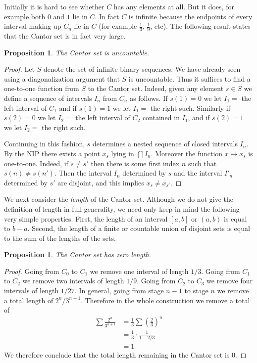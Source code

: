 \documentclass[11pt,oneside]{amsbook}
\theoremstyle{definition}
\theoremstyle{plain}
\newtheorem{proposition}[theorem]{Proposition}
\theoremstyle{definition}
\theoremstyle{remark}
\numberwithin{equation}{section}
\numberwithin{figure}{section}
\begin{document}
Initially it is hard to see whether $C$ has any elements at all. But it does, for example both $0$ and $1$ lie in $C$. In fact $C$ is infinite because the endpoints of every interval making up $C_n$ lie in $C$ (for example $\frac13$, $\frac19$, etc). The following result states that the Cantor set is in fact very large.

\begin{proposition}
  The Cantor set is uncountable.
\end{proposition}

\begin{proof}
  Let $S$ denote the set of infinite binary sequences. We have already seen using a diagonalization argument that $S$ is uncountable. Thus it suffices to find a one-to-one function from $S$ to the Cantor set. Indeed, given any element $s\in S$ we define a sequence of intervals $I_n$ from $C_n$ as follows. If $s(1)=0$ we let $I_1=$ the left interval of $C_1$ and if $s(1)=1$ we let $I_1=$ the right such. Similarly if $s(2)=0$ we let $I_2=$ the left interval of $C_2$ contained in $I_1$, and if $s(2)=1$ we let $I_2=$ the right such.

  Continuing in this fashion, $s$ determines a nested sequence of closed intervals $I_n$. By the NIP there exists a point $x_s$ lying in $\bigcap I_n$. Moreover the function $x\mapsto x_s$ is one-to-one. Indeed, if $s\neq s'$ then there is some first index $n$ such that $s(n)\neq s(n')$. Then the interval $I_n$ determined by $s$ and the interval $I'_n$ determined by $s'$ are disjoint, and this implies $x_s\neq x_{s'}$.
\end{proof}

We next consider the \emph{length} of the Cantor set. Although we do not give the definition of length in full generality, we need only keep in mind the following very simple properties. First, the length of an interval $[a,b]$ or $(a,b)$ is equal to $b-a$. Second, the length of a finite or countable union of disjoint sets is equal to the sum of the lengths of the sets.

\begin{proposition}
  The Cantor set has zero length.
\end{proposition}

\begin{proof}
  Going from $C_0$ to $C_1$ we remove one interval of length $1/3$. Going from $C_1$ to $C_2$ we remove two intervals of length $1/9$. Going from $C_2$ to $C_3$ we remove four intervals of length $1/27$. In general, going from stage $n-1$ to stage $n$ we remove a total length of $2^n/3^{n+1}$. Therefore in the whole construction we remove a total of
  \begin{align*}
    \sum\frac{2^n}{3^{n+1}}&=\frac13\sum\left(\frac23\right)^n\\
                           &=\frac13\cdot\frac{1}{1-2/3}\\
                           &=1
  \end{align*}
  We therefore conclude that the total length remaining in the Cantor set is $0$.
\end{proof}
\end{document}
